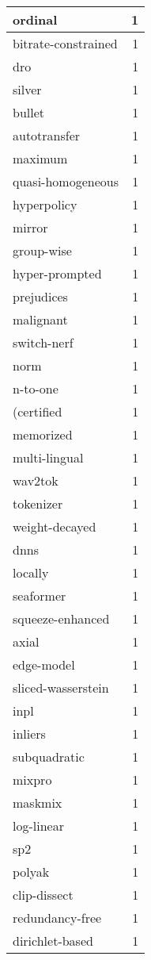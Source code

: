 \begin{table}[h]
\begin{tabular}{|l|r|}
ordinal & 1 \\
\hline
bitrate-constrained & 1 \\
\hline
dro & 1 \\
\hline
silver & 1 \\
\hline
bullet & 1 \\
\hline
autotransfer & 1 \\
\hline
maximum & 1 \\
\hline
quasi-homogeneous & 1 \\
\hline
hyperpolicy & 1 \\
\hline
mirror & 1 \\
\hline
group-wise & 1 \\
\hline
hyper-prompted & 1 \\
\hline
prejudices & 1 \\
\hline
malignant & 1 \\
\hline
switch-nerf & 1 \\
\hline
norm & 1 \\
\hline
n-to-one & 1 \\
\hline
(certified & 1 \\
\hline
memorized & 1 \\
\hline
multi-lingual & 1 \\
\hline
wav2tok & 1 \\
\hline
tokenizer & 1 \\
\hline
weight-decayed & 1 \\
\hline
dnns & 1 \\
\hline
locally & 1 \\
\hline
seaformer & 1 \\
\hline
squeeze-enhanced & 1 \\
\hline
axial & 1 \\
\hline
edge-model & 1 \\
\hline
sliced-wasserstein & 1 \\
\hline
inpl & 1 \\
\hline
inliers & 1 \\
\hline
subquadratic & 1 \\
\hline
mixpro & 1 \\
\hline
maskmix & 1 \\
\hline
log-linear & 1 \\
\hline
sp2 & 1 \\
\hline
polyak & 1 \\
\hline
clip-dissect & 1 \\
\hline
redundancy-free & 1 \\
\hline
dirichlet-based & 1 \\

\end{tabular}
\end{table}
